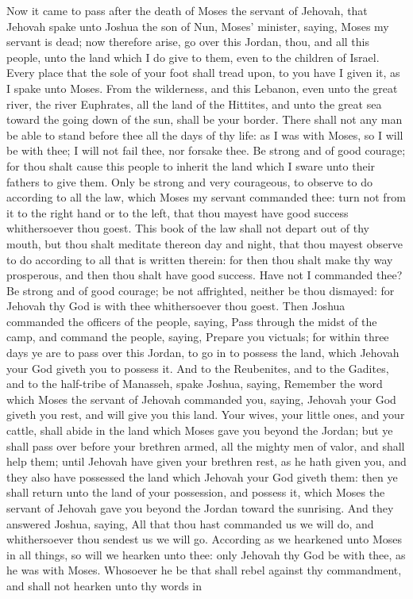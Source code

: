 


Now it came to pass after the death of Moses the servant of Jehovah, that Jehovah spake unto Joshua the son of Nun, Moses’ minister, saying, Moses my servant is dead; now therefore arise, go over this Jordan, thou, and all this people, unto the land which I do give to them, even to the children of Israel. Every place that the sole of your foot shall tread upon, to you have I given it, as I spake unto Moses. From the wilderness, and this Lebanon, even unto the great river, the river Euphrates, all the land of the Hittites, and unto the great sea toward the going down of the sun, shall be your border. There shall not any man be able to stand before thee all the days of thy life: as I was with Moses, so I will be with thee; I will not fail thee, nor forsake thee. Be strong and of good courage; for thou shalt cause this people to inherit the land which I sware unto their fathers to give them. Only be strong and very courageous, to observe to do according to all the law, which Moses my servant commanded thee: turn not from it to the right hand or to the left, that thou mayest have good success whithersoever thou goest. This book of the law shall not depart out of thy mouth, but thou shalt meditate thereon day and night, that thou mayest observe to do according to all that is written therein: for then thou shalt make thy way prosperous, and then thou shalt have good success. Have not I commanded thee? Be strong and of good courage; be not affrighted, neither be thou dismayed: for Jehovah thy God is with thee whithersoever thou goest.  Then Joshua commanded the officers of the people, saying, Pass through the midst of the camp, and command the people, saying, Prepare you victuals; for within three days ye are to pass over this Jordan, to go in to possess the land, which Jehovah your God giveth you to possess it.  And to the Reubenites, and to the Gadites, and to the half-tribe of Manasseh, spake Joshua, saying, Remember the word which Moses the servant of Jehovah commanded you, saying, Jehovah your God giveth you rest, and will give you this land. Your wives, your little ones, and your cattle, shall abide in the land which Moses gave you beyond the Jordan; but ye shall pass over before your brethren armed, all the mighty men of valor, and shall help them; until Jehovah have given your brethren rest, as he hath given you, and they also have possessed the land which Jehovah your God giveth them: then ye shall return unto the land of your possession, and possess it, which Moses the servant of Jehovah gave you beyond the Jordan toward the sunrising. And they answered Joshua, saying, All that thou hast commanded us we will do, and whithersoever thou sendest us we will go. According as we hearkened unto Moses in all things, so will we hearken unto thee: only Jehovah thy God be with thee, as he was with Moses. Whosoever he be that shall rebel against thy commandment, and shall not hearken unto thy words in 